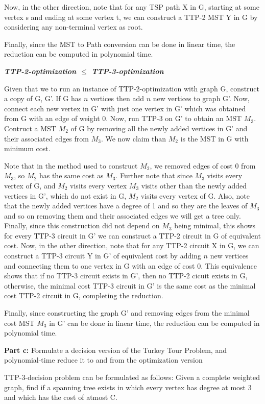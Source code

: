 \documentclass[8pt]{article}
\begin{document}
Now, in the other direction, note that for any TSP path X in G, starting at some vertex s and
ending at some vertex t, we can construct a TTP-2 MST Y in G by considering any non-terminal vertex
as root.

Finally, since the MST to Path conversion can be done in linear time, the reduction can be computed in polynomial time.


\textbf{\textit{TTP-2-optimization $\leq$ TTP-3-optimization}}

Given that we to run an instance of TTP-2-optimization with graph G, construct a copy of G, G'. If G has $n$ vertices
then add $n$ new vertices to graph G'. Now, connect each new vertex in G' with just one vertex in G' which was obtained
from G with an edge of weight 0. Now, run TTP-3 on G' to obtain an MST $M_3$. Contruct a MST $M_2$ of G by removing all the newly
added vertices in G' and their associated edges from $M_3$. We now claim than $M_2$ is the MST in G with minimum cost.

Note that in the method used to construct $M_2$, we removed edges of cost 0 from $M_3$, so $M_2$ has the
same cost as $M_3$. Further note that since $M_3$ visits every vertex of G, and $M_2$ visits every vertex 
$M_3$ visits other than the newly added vertices in G', which do not exist in G, $M_2$ visits every vertex of G.
Also, note that the newly added vertices have a degree of 1 and so they are the leaves of $M_3$ and so on removing
them and their associated edges we will get a tree only.
Finally, since this construction did not depend on $M_3$ being minimal, this shows for
every TTP-3 circuit in G' we can construct a TTP-2 circuit in G of equivalent cost.
Now, in the other direction, note that for any TTP-2 circuit X in G, we can construct a TTP-3 circuit Y in G' of
equivalent cost by adding $n$ new vertices and connecting them to one vertex in G with an edge of cost 0.
This equivalence shows that if no TTP-3 circuit exists in G', then no TTP-2 cicuit exists in G, otherwise,
the minimal cost TTP-3 circuit in G' is the same cost as the minimal cost TTP-2 circuit in G, completing the reduction.

Finally, since constructing the graph G' and removing edges from the minimal cost MST $M_3$ in G' can be done in linear time,
the reduction can be computed in polynomial time.

\textbf{Part c:} Formulate a decision version of the Turkey Tour Problem, and polynomial-time reduce it to and from the optimization version

TTP-3-decision problem can be formulated as follows:
Given a complete weighted graph, find if a spanning tree exists in which every vertex has degree at most 3 and which has the cost of atmost C.
\end{document}
